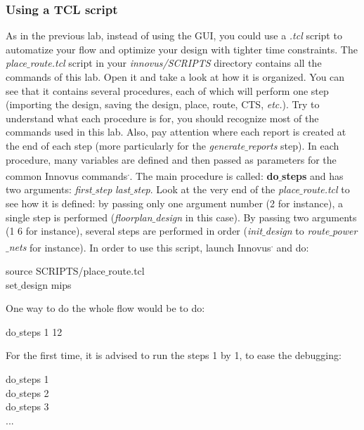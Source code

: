 \subsubsection{Using a TCL script}
As in the previous lab, instead of using the GUI, you could use a \textit{.tcl} script to automatize your flow and optimize your design with tighter time constraints. The \textit{place$\_$route.tcl} script in your \textit{innovus/SCRIPTS} directory contains all the commands of this lab. Open it and take a look at how it is organized. You can see that it contains several procedures, each of which will perform one step (importing the design, saving the design, place, route, CTS, \textit{etc.}). Try to understand what each procedure is for, you should recognize most of the commands used in this lab. Also, pay attention where each report is created at the end of each step (more particularly for the \textit{generate$\_$reports} step). In each procedure, many variables are defined and then passed as parameters for the common Innovus commands\textsuperscript{\tiny\textregistered.}. The main procedure is called: \textbf{do$\_$steps} and has two arguments:  \textit{first$\_$step} \textit{last$\_$step}. Look at the very end of the \textit{place$\_$route.tcl} to see how it is defined: by passing only one argument number (2 for instance), a single step is performed (\textit{floorplan$\_$design} in this case). By passing two arguments (1 6 for instance), several steps are performed in order (\textit{init$\_$design} to \textit{route$\_$power$\_$nets} for instance). In order to use this script, launch Innovus\textsuperscript{\tiny\textregistered.} and do:

\begin{codeline}
source SCRIPTS/place$\_$route.tcl \\
set$\_$design mips
\end{codeline}

One way to do the whole flow would be to do:

\begin{codeline}
do$\_$steps 1 12
\end{codeline}

For the first time, it is advised to run the steps 1 by 1, to ease the debugging:
\begin{codeline}
	do$\_$steps 1 \\
		do$\_$steps 2 \\
			do$\_$steps 3 \\
			...
\end{codeline}

